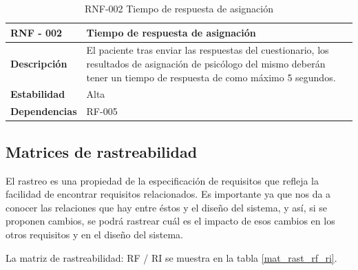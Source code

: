 \begin{table}[htpb]
\centering
\begin{tabularx}{\textwidth}{|l|X|}
\hline
\rowcolor[gray]{0.9}\textbf{RNF - 002}                               & \textbf{Tiempo de respuesta de asignación}                                                                                                                                            \\ \hline
\textbf{Descripción}                             & El paciente tras enviar las respuestas del cuestionario, los resultados de asignación de psicólogo del mismo deberán tener un tiempo de respuesta de como máximo 5 segundos. \\ \hline
\textbf{Estabilidad}                             & Alta                                                                                                                                                                         \\ \hline
\textbf{Dependencias} & RF-005                                                                                                                                                                       \\ \hline
\end{tabularx}
\caption{RNF-002 Tiempo de respuesta de asignación}                                                                                                                                                                                                                                                                      
\end{table}


\subsection{Matrices de rastreabilidad}

El rastreo es una propiedad de la especificación de requisitos que refleja la facilidad de encontrar requisitos relacionados. Es importante ya que nos da a conocer las relaciones que hay entre éstos y el diseño del sistema, y así, si se proponen cambios, se podrá rastrear cuál es el impacto de esos cambios en los otros requisitos y en el diseño del sistema.


La matriz de rastreabilidad: RF / RI se muestra en la tabla \ref{mat_rast_rf_ri}.

